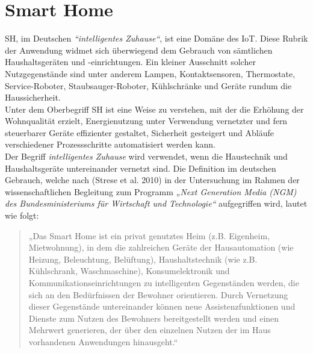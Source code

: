 
\section{Smart Home}
\label{sec:smartHome}
    \acl{SH}, im Deutschen \textit{“intelligentes Zuhause“}, ist eine Domäne des \acs{IoT}. 
    Diese Rubrik der Anwendung widmet sich überwiegend dem Gebrauch von sämtlichen Haushaltsgeräten 
    und -einrichtungen. Ein kleiner Ausschnitt solcher Nutzgegenstände sind unter anderem Lampen, Kontaktsensoren, 
    Thermostate, Service-Roboter, Staubsauger-Roboter, Kühlschränke und Geräte rundum die Haussicherheit. 
    \\ 
    Unter dem Oberbegriff \acl{SH} ist eine Weise zu verstehen, mit der die Erhöhung der Wohnqualität erzielt, 
    Energienutzung unter Verwendung vernetzter und fern steuerbarer Geräte effizienter gestaltet, Sicherheit gesteigert 
    und Abläufe verschiedener Prozessschritte automatisiert werden kann.
    \\ 
    Der Begriff \textit{intelligentes Zuhause} wird verwendet, wenn die Haustechnik und Haushaltsgeräte untereinander 
    vernetzt sind. Die Definition im deutschen Gebrauch, welche nach (Strese et al. 2010) in der Untersuchung im Rahmen 
    der wissenschaftlichen Begleitung zum Programm \textit{„Next Generation Media (NGM) des Bundesministeriums für Wirtschaft und Technologie“} 
    aufgegriffen wird, lautet wie folgt: 
    \begin{quote}
        „Das Smart Home ist ein privat genutztes Heim (z.B. Eigenheim, Mietwohnung), in dem die zahlreichen Geräte der 
        Hausautomation (wie Heizung, Beleuchtung, Belüftung), Haushaltstechnik (wie z.B. Kühlschrank, Waschmaschine), 
        Konsumelektronik und Kommunikationseinrichtungen zu intelligenten Gegenständen werden, die sich an den 
        Bedürfnissen der Bewohner orientieren. Durch Vernetzung dieser Gegenstände untereinander können neue 
        Assistenzfunktionen und Dienste zum Nutzen des Bewohners bereitgestellt werden und einen Mehrwert 
        generieren, der über den einzelnen Nutzen der im Haus vorhandenen Anwendungen hinausgeht.“ \cite{strese.2010m}
    \end{quote}
